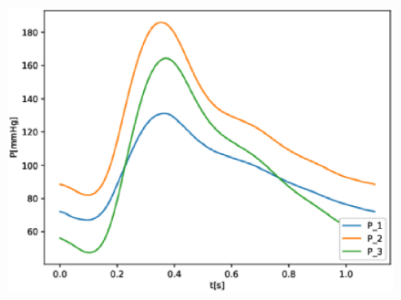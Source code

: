 \documentclass[compress]{beamer}
\begin{document}
\begin{frame}
\begin{figure}
\begin{center}
\begin{minipage}[t][0.35\paperheight][t]{\textwidth}
\begin{minipage}{0.09\textwidth}
				\end{minipage}
				\hfill
				\begin{minipage}{0.44\textwidth}
					\includegraphics[width=\textwidth]{images/compare_output_params_P_P.eps}
				\end{minipage}
			\end{minipage}
		\end{center}
	\end{figure}
	\begin{minipage}[t][0.44\paperheight][t]{\textwidth}
	\end{minipage}
\end{frame}
\end{document}
